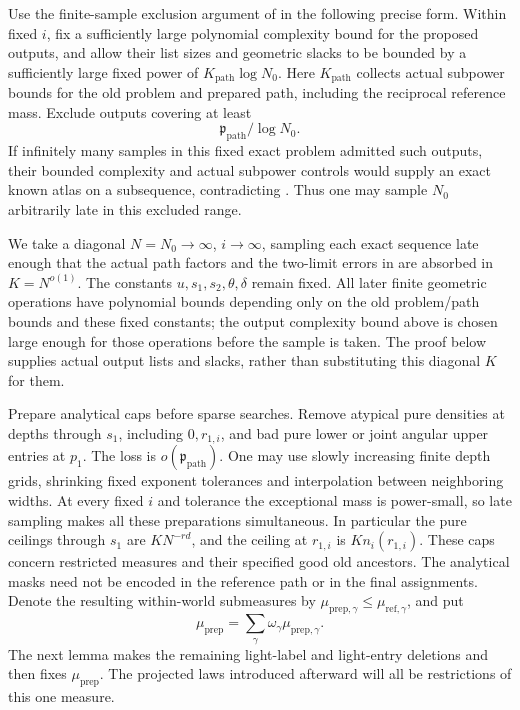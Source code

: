 Use the finite-sample exclusion argument of  in the
following precise form.  Within fixed \(i\), fix a sufficiently large
polynomial complexity bound for the proposed outputs, and allow their
list sizes and geometric slacks to be bounded by a sufficiently large
fixed power of \(K_{\mathrm{path}}\log N_0\).  Here
\(K_{\mathrm{path}}\) collects actual subpower bounds for the old
problem and prepared path, including the reciprocal reference mass.
Exclude outputs covering at least
\begin{equation}
 \label{a08:required-output-mass}
 \mathfrak p_{\mathrm{path}}/\log N_0.
\end{equation}
If infinitely many samples in this fixed exact problem admitted such
outputs, their bounded complexity and actual subpower controls would
supply an exact known atlas on a subsequence, contradicting
.  Thus one may sample \(N_0\) arbitrarily
late in this excluded range.

We take a diagonal \(N=N_0\to\infty\), \(i\to\infty\), sampling each
exact sequence late enough that the actual path factors and the
two-limit errors in  are absorbed in
\(K=N^{o(1)}\).  The constants
\(u,s_1,s_2,\theta,\delta\) remain fixed.  All later finite geometric
operations have polynomial bounds depending only on the old
problem/path bounds and these fixed constants; the output complexity
bound above is chosen large enough for those operations before the
sample is taken.  The proof below supplies actual output lists and
slacks, rather than substituting this diagonal \(K\) for them.

Prepare analytical caps before sparse searches.  Remove atypical pure
densities at depths through \(s_1\), including \(0,r_{1,i}\), and bad
pure lower or joint angular upper entries at \(p_1\).
The loss is \(o(\mathfrak p_{\mathrm{path}})\).  One may use slowly
increasing finite depth grids, shrinking fixed exponent tolerances
and interpolation between neighboring widths.  At every fixed \(i\)
and tolerance the exceptional mass is power-small, so late sampling
makes all these preparations simultaneous.  In particular the pure
ceilings through \(s_1\) are \(KN^{-rd}\), and the ceiling at
\(r_{1,i}\) is \(Kn_i(r_{1,i})\).
These caps concern restricted measures and their specified good old
ancestors.  The analytical masks need not be encoded in the reference
path or in the final assignments.
Denote the resulting within-world submeasures by
\(\mu_{\mathrm{prep},\gamma}\le\mu_{\mathrm{ref},\gamma}\), and put
\[
 \mu_{\mathrm{prep}}
   =\sum_\gamma\omega_\gamma\mu_{\mathrm{prep},\gamma}.
\]
The next lemma makes the remaining light-label and light-entry
deletions and then fixes \(\mu_{\mathrm{prep}}\).  The projected laws
introduced afterward will all be restrictions of this one measure.

